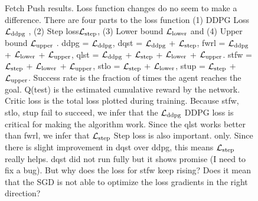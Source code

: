 \begin{figure}
  \caption{
    Fetch Push results. Loss function changes do no seem to make a difference.
    There are four parts to the loss function (1) DDPG Loss $\mathcal{L}_{\text{ddpg}}$ ,
    (2) Step loss$\mathcal{L}_{\text{step}}$,  
    (3) Lower bound $\mathcal{L}_{\text{lower}}$ and
    (4) Upper bound $\mathcal{L}_{\text{upper}}$ .
    ddpg = $\mathcal{L}_{\text{ddpg}}$,
    dqst = $\mathcal{L}_{\text{ddpg}}$ + $\mathcal{L}_{\text{step}}$,
    fwrl = $\mathcal{L}_{\text{ddpg}}$ + $\mathcal{L}_{\text{lower}}$ +
    $\mathcal{L}_{\text{upper}}$,
    qlst = $\mathcal{L}_{\text{ddpg}}$ + $\mathcal{L}_{\text{step}}$ + $\mathcal{L}_{\text{lower}}$ + $\mathcal{L}_{\text{upper}}$.
    stfw = $\mathcal{L}_{\text{step}}$ + $\mathcal{L}_{\text{lower}}$ + $\mathcal{L}_{\text{upper}}$,
    stlo = $\mathcal{L}_{\text{step}}$ + $\mathcal{L}_{\text{lower}}$,
    stup = $\mathcal{L}_{\text{step}}$ + $\mathcal{L}_{\text{upper}}$.
    Success rate is the fraction of times the agent reaches the goal. Q(test) is
    the estimated cumulative reward by the network. Critic loss is the total
    loss plotted during training.
    Because stfw, stlo, stup fail to succeed, we infer that the $\mathcal{L}_{\text{ddpg}}$ DDPG loss is
    critical for making the algorithm work. Since the qlst works better than
    fwrl, we infer that $\mathcal{L}_{\text{step}}$ Step loss is also important.
    only.
    Since there is slight improvement in dqst over ddpg, this means
    $\mathcal{L}_{\text{step}}$ really helps. dqst did not run fully but it shows
    promise (I need to fix a bug).
    But why does the loss for stfw keep rising? Does it mean that the SGD is not
    able to optimize the loss gradients in the right direction?
  }%
  \label{fig:fwrl-stepfwrl-noop-FetchPush}%
\end{figure}%
% 